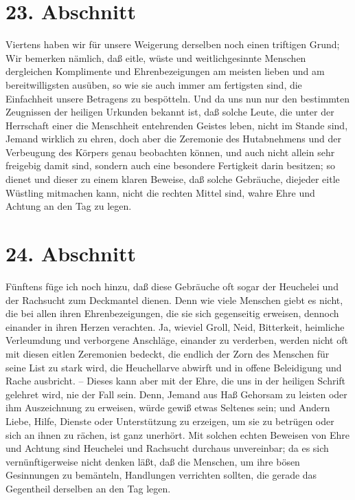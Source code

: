 \section{23. Abschnitt} \label{kap9_ab23}

Viertens haben wir für unsere Weigerung derselben noch einen triftigen Grund;
Wir bemerken nämlich, daß eitle, wüste und weitlichgesinnte Menschen dergleichen
Komplimente und Ehrenbezeigungen am meisten lieben und am bereitwilligsten
ausüben, so wie sie auch immer am fertigsten sind, die Einfachheit unsere
Betragens zu bespötteln. Und da uns nun nur den bestimmten Zeugnissen der
heiligen Urkunden bekannt ist, daß solche Leute, die unter der Herrschaft einer
die Menschheit entehrenden Geistes leben, nicht im Stande sind, Jemand wirklich
zu ehren, doch aber die Zeremonie des Hutabnehmens und der Verbeugung des
Körpers genau beobachten können, und auch nicht allein sehr freigebig damit
sind, sondern auch eine besondere Fertigkeit darin besitzen; so dienet und
dieser zu einem klaren Beweise, daß solche Gebräuche, diejeder eitle Wüstling
mitmachen kann, nicht die rechten Mittel sind, wahre Ehre und Achtung an den Tag
zu legen.

\section{24. Abschnitt} \label{kap9_ab24}

Fünftens füge ich noch hinzu, daß diese Gebräuche oft sogar der
Heuchelei und
der Rachsucht zum Deckmantel dienen. Denn wie viele Menschen giebt es nicht, die
bei allen ihren Ehrenbezeigungen, die sie sich gegenseitig erweisen, dennoch
einander in ihren Herzen verachten. Ja, wieviel Groll, Neid, Bitterkeit,
heimliche Verleumdung und verborgene Anschläge, einander zu verderben, werden
nicht oft mit diesen eitlen Zeremonien bedeckt, die endlich der Zorn des
Menschen für seine List zu stark wird, die Heuchellarve abwirft und in offene
Beleidigung und Rache ausbricht. -- Dieses kann aber mit der Ehre, die uns in
der heiligen Schrift gelehret wird, nie der Fall sein. Denn, Jemand aus Haß
Gehorsam zu leisten oder ihm Auszeichnung zu erweisen, würde gewiß etwas
Seltenes sein; und Andern Liebe, Hilfe, Dienste oder Unterstützung zu erzeigen,
um sie zu betrügen oder sich an ihnen zu rächen, ist ganz unerhört. Mit solchen
echten Beweisen von Ehre und Achtung sind Heuchelei und Rachsucht durchaus
unvereinbar; da es sich vernünftigerweise nicht denken läßt, daß die Menschen,
um ihre bösen Gesinnungen zu bemänteln, Handlungen verrichten sollten, die
gerade das Gegentheil derselben an den Tag legen.

